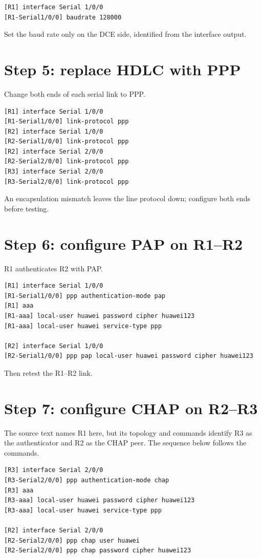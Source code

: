 
\begin{lstlisting}[style=dcnterminal]
[R1] interface Serial 1/0/0
[R1-Serial1/0/0] baudrate 128000
\end{lstlisting}

\begin{keyidea}
Set the baud rate only on the DCE side, identified from the interface output.
\end{keyidea}

\section{Step 5: replace HDLC with PPP}
Change both ends of each serial link to PPP.
\begin{lstlisting}[style=dcnterminal]
[R1] interface Serial 1/0/0
[R1-Serial1/0/0] link-protocol ppp
[R2] interface Serial 1/0/0
[R2-Serial1/0/0] link-protocol ppp
[R2] interface Serial 2/0/0
[R2-Serial2/0/0] link-protocol ppp
[R3] interface Serial 2/0/0
[R3-Serial2/0/0] link-protocol ppp
\end{lstlisting}
An encapsulation mismatch leaves the line protocol down; configure both ends before testing.

\section{Step 6: configure PAP on R1--R2}
R1 authenticates R2 with PAP.
\begin{lstlisting}[style=dcnterminal]
[R1] interface Serial 1/0/0
[R1-Serial1/0/0] ppp authentication-mode pap
[R1] aaa
[R1-aaa] local-user huawei password cipher huawei123
[R1-aaa] local-user huawei service-type ppp

[R2] interface Serial 1/0/0
[R2-Serial1/0/0] ppp pap local-user huawei password cipher huawei123
\end{lstlisting}
Then retest the R1--R2 link.

\section{Step 7: configure CHAP on R2--R3}
The source text names R1 here, but its topology and commands identify R3 as the authenticator and R2 as the CHAP peer. The sequence below follows the commands.

\begin{lstlisting}[style=dcnterminal]
[R3] interface Serial 2/0/0
[R3-Serial2/0/0] ppp authentication-mode chap
[R3] aaa
[R3-aaa] local-user huawei password cipher huawei123
[R3-aaa] local-user huawei service-type ppp

[R2] interface Serial 2/0/0
[R2-Serial2/0/0] ppp chap user huawei
[R2-Serial2/0/0] ppp chap password cipher huawei123
\end{lstlisting}

